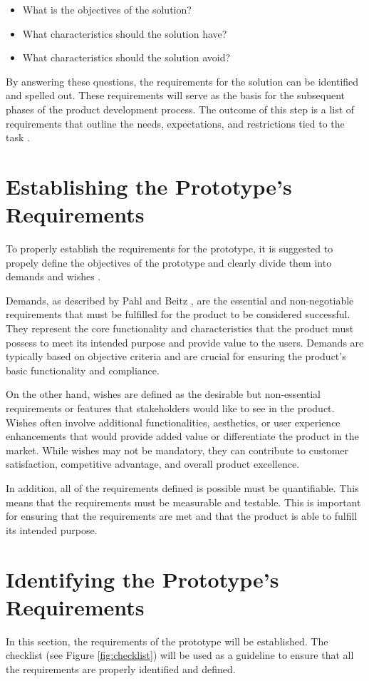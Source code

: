 \begin{itemize}
    \item What is the objectives of the solution?
    \item What characteristics should the solution have?
    \item What characteristics should the solution avoid?
\end{itemize}

By answering these questions, the requirements for the solution can be identified and spelled out. These requirements will serve as the basis for the subsequent phases of the product development process. The outcome of this step is a list of requirements that outline the needs, expectations, and restrictions tied to the task \cite{Pahl07a}.

\section{Establishing the Prototype's Requirements}
To properly establish the requirements for the prototype, it is suggested to propely define the objectives of the prototype and clearly divide them into demands and wishes \cite{Pahl07n}.

Demands, as described by Pahl and Beitz \cite{Pahl07n}, are the essential and non-negotiable requirements that must be fulfilled for the product to be considered successful. They represent the core functionality and characteristics that the product must possess to meet its intended purpose and provide value to the users. Demands are typically based on objective criteria and are crucial for ensuring the product's basic functionality and compliance.

On the other hand, wishes are defined as the desirable but non-essential requirements or features that stakeholders would like to see in the product. Wishes often involve additional functionalities, aesthetics, or user experience enhancements that would provide added value or differentiate the product in the market. While wishes may not be mandatory, they can contribute to customer satisfaction, competitive advantage, and overall product excellence.

In addition, all of the requirements defined is possible must be quantifiable. This means that the requirements must be measurable and testable. This is important for ensuring that the requirements are met and that the product is able to fulfill its intended purpose.


\section{Identifying the Prototype's Requirements}
In this section, the requirements of the prototype will be established. The checklist (see Figure \ref{fig:checklist}) will be used as a guideline to ensure that all the requirements are properly identified and defined.

